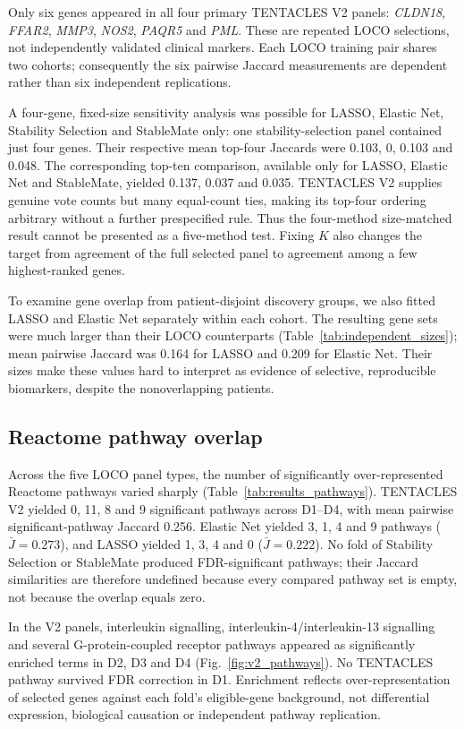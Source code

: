 Only six genes appeared in all four primary TENTACLES V2 panels: \textit{CLDN18}, \textit{FFAR2}, \textit{MMP3}, \textit{NOS2}, \textit{PAQR5} and \textit{PML}. These are repeated LOCO selections, not independently validated clinical markers. Each LOCO training pair shares two cohorts; consequently the six pairwise Jaccard measurements are dependent rather than six independent replications.

A four-gene, fixed-size sensitivity analysis was possible for LASSO, Elastic Net, Stability Selection and StableMate only: one stability-selection panel contained just four genes. Their respective mean top-four Jaccards were 0.103, 0, 0.103 and 0.048. The corresponding top-ten comparison, available only for LASSO, Elastic Net and StableMate, yielded 0.137, 0.037 and 0.035. TENTACLES V2 supplies genuine vote counts but many equal-count ties, making its top-four ordering arbitrary without a further prespecified rule. Thus the four-method size-matched result cannot be presented as a five-method test. Fixing $K$ also changes the target from agreement of the full selected panel to agreement among a few highest-ranked genes.

To examine gene overlap from patient-disjoint discovery groups, we also fitted LASSO and Elastic Net separately within each cohort. The resulting gene sets were much larger than their LOCO counterparts (Table~\ref{tab:independent_sizes}); mean pairwise Jaccard was 0.164 for LASSO and 0.209 for Elastic Net. Their sizes make these values hard to interpret as evidence of selective, reproducible biomarkers, despite the nonoverlapping patients.


\subsection{Reactome pathway overlap}
\label{sec:results_pathways}
Across the five LOCO panel types, the number of significantly over-represented Reactome pathways varied sharply (Table~\ref{tab:results_pathways}). TENTACLES V2 yielded 0, 11, 8 and 9 significant pathways across D1--D4, with mean pairwise significant-pathway Jaccard 0.256. Elastic Net yielded 3, 1, 4 and 9 pathways ($\bar J=0.273$), and LASSO yielded 1, 3, 4 and 0 ($\bar J=0.222$). No fold of Stability Selection or StableMate produced FDR-significant pathways; their Jaccard similarities are therefore undefined because every compared pathway set is empty, not because the overlap equals zero.


In the V2 panels, interleukin signalling, interleukin-4/interleukin-13 signalling and several G-protein-coupled receptor pathways appeared as significantly enriched terms in D2, D3 and D4 (Fig.~\ref{fig:v2_pathways}). No TENTACLES pathway survived FDR correction in D1. Enrichment reflects over-representation of selected genes against each fold's eligible-gene background, not differential expression, biological causation or independent pathway replication.




